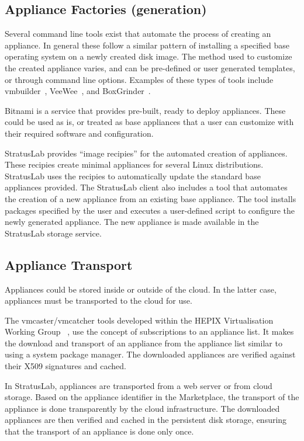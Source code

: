 \subsection{Appliance Factories (generation)}

Several command line tools exist that automate the process of creating an appliance. In general these follow 
a similar pattern of installing a specified base operating system on a newly created disk image. The method used to 
customize the created appliance varies, and can be pre-defined or user generated templates, or through command line options. 
Examples of these types of tools include vmbuilder~\cite{vmbuilder}, VeeWee~\cite{veewee}, and BoxGrinder~\cite{boxgrinder}.

Bitnami is a service that provides pre-built, ready to deploy appliances.
These could be used as is, or treated as base appliances that a user can customize with their 
required software and configuration.

StratusLab provides ``image recipies'' for the automated creation of appliances. 
These recipies create minimal appliances for several Linux distributions. StratusLab uses 
the recipies to automatically update the standard base appliances provided. The StratusLab 
client also includes a tool that automates the creation of a new appliance from an existing base appliance.
The tool installs packages specified by the user and executes a user-defined  
script to configure the newly generated appliance. The new appliance is made available 
in the StratusLab storage service.

\subsection{Appliance Transport}

Appliances could be stored inside or outside of the cloud. In the latter case, 
appliances must be transported to the cloud for use.

The vmcaster/vmcatcher tools developed within the HEPIX Virtualisation Working
Group ~\cite{hepixbooktransfer}, use the concept of subscriptions to an 
appliance list. It makes the download and transport of an appliance 
from the appliance list similar to using a system package manager.
The downloaded appliances are
verified against their X509 signatures and cached.

In StratusLab, appliances are transported from a web
server or from cloud storage. Based on the appliance identifier in the Marketplace,
the transport of the appliance is done transparently by the cloud infrastructure.
The downloaded appliances are then verified and cached in the persistent disk storage,
ensuring that the transport of an appliance is done only once.

